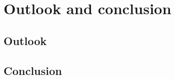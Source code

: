 \documentclass[../Thesis_AHoecherl.tex]{subfiles}
\begin{document}
    \chapter{Outlook and conclusion}\label{Outlook and Conclusion}
    \section{Outlook}\label{Outlook}
    \section{Conclusion}\label{Conclusion}
\end{document}

